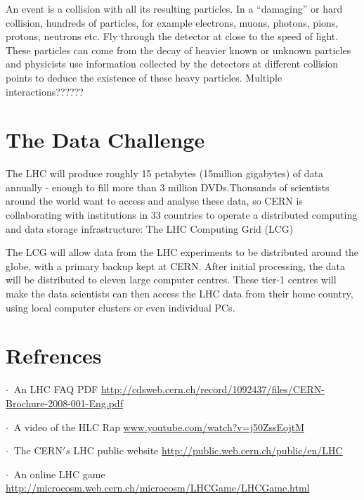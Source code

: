 \noindent
An event is a collision with all its resulting particles. In a ``damaging''  or hard collision, hundreds of particles, for example electrons, muons, photons, pions, protons, neutrons etc. Fly through the detector at close to the speed of light. These particles can come from the decay of heavier known or unknown particles and physicists use information collected by the detectors at different collision points to deduce the existence of these heavy particles. Multiple interactions??????

\;
\;

\section{The Data Challenge}

\noindent
The LHC will produce roughly 15 petabytes (15million gigabytes) of data annually - enough to fill more than 3 million DVDs.Thousands of scientists around the world want to access and analyse these data, so CERN is collaborating with institutions in 33 countries to operate a distributed computing and data storage infrastructure: The LHC Computing Grid (LCG)

\;
\;

\noindent
The LCG will allow data from the LHC experiments to be distributed around the globe, with a primary backup kept at CERN. After initial processing, the data will be distributed to eleven large computer centres. These tier-1 centres will make the data scientists can then access the LHC data from their home country, using local computer clusters or even individual PCs.

\;
\;

\section{Refrences}

\;

          $ \cdot \:$ An LHC FAQ PDF \url{http://cdsweb.cern.ch/record/1092437/files/CERN-Brochure-2008-001-Eng.pdf}

\;
\noindent
          $ \cdot \:$  A video of the HLC Rap \url{www.youtube.com/watch?v=j50ZssEojtM}

\;
\noindent
          $ \cdot \:$ The CERN$'s$ LHC public website \url{http://public.web.cern.ch/public/en/LHC}

\;
\noindent
          $ \cdot \:$ An online LHC game \url{http://microcosm.web.cern.ch/microcosm/LHCGame/LHCGame.html}


\;
